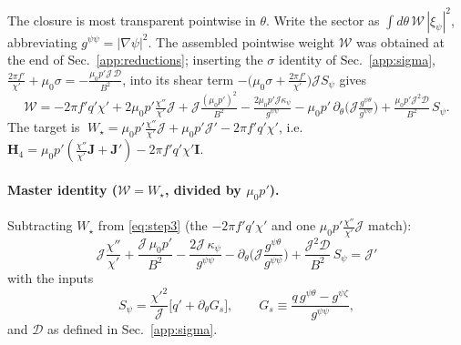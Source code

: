 \documentclass[10pt,a4paper]{article}
\numberwithin{equation}{section}
\begin{document}
The closure is most transparent pointwise in $\theta$.  Write the sector as
$\int d\theta\,\mathcal W\,|\xi_\psi|^2$, abbreviating $g^{\psi\psi}=|\nabla\psi|^2$.  The
assembled pointwise weight $\mathcal W$ was obtained at the end of
Sec.~\ref{app:reductions}; inserting the $\sigma$ identity of
Sec.~\ref{app:sigma},
$\tfrac{2\pi f'}{\chi'}+\mu_0\sigma=-\tfrac{\mu_0p'\mathcal J\,\mathcal D}{B^2}$,
into its shear term $-\big(\mu_0\sigma+\tfrac{2\pi f'}{\chi'}\big)\mathcal J S_\psi$
gives
\begin{equation}
\mathcal W=-2\pi f'q'\chi'
+2\mu_0p'\tfrac{\chi''}{\chi'}\mathcal J
+\mathcal J\tfrac{(\mu_0p')^2}{B^2}
-\tfrac{2\mu_0p'\mathcal J\kappa_\psi}{g^{\psi\psi}}
-\mu_0p'\,\partial_\theta\!\big(\mathcal J\tfrac{g^{\psi\theta}}{g^{\psi\psi}}\big)
+\tfrac{\mu_0p'\mathcal J^2\mathcal D}{B^2}\,S_\psi .
\label{eq:step3}
\end{equation}
The target is
$\;W_\star=\mu_0p'\tfrac{\chi''}{\chi'}\mathcal J+\mu_0p'\mathcal J'-2\pi f'q'\chi'$,
i.e.\ $\mathbf H_4=\mu_0p'(\tfrac{\chi''}{\chi'}\mathbf J+\mathbf J')-2\pi f'q'\chi'\mathbf I$.

\paragraph{Master identity ($\mathcal W=W_\star$, divided by $\mu_0p'$).}
Subtracting $W_\star$ from \eqref{eq:step3} (the $-2\pi f'q'\chi'$ and one $\mu_0p'\tfrac{\chi''}{\chi'}\mathcal J$ match):
\begin{equation}
\boxed{\;
\mathcal J\frac{\chi''}{\chi'}
+\frac{\mathcal J\,\mu_0p'}{B^2}
-\frac{2\mathcal J\,\kappa_\psi}{g^{\psi\psi}}
-\partial_\theta\!\Big(\mathcal J\frac{g^{\psi\theta}}{g^{\psi\psi}}\Big)
+\frac{\mathcal J^2\mathcal D}{B^2}\,S_\psi
=\mathcal J' \;}
\label{eq:master}
\end{equation}
with the inputs
\begin{equation}
S_\psi=\frac{\chi'^2}{\mathcal J}\Big[q'+\partial_\theta G_s\Big],
\qquad
G_s\equiv\frac{q\,g^{\psi\theta}-g^{\psi\zeta}}{g^{\psi\psi}},
\label{eq:DSdef}
\end{equation}
and $\mathcal D$ as defined in Sec.~\ref{app:sigma}.
\end{document}
